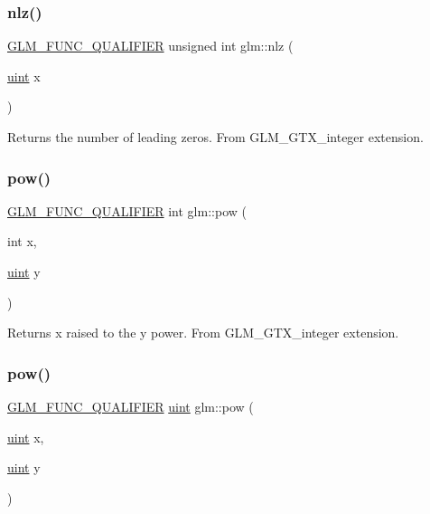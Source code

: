 \subsubsection{\texorpdfstring{nlz()}{nlz()}}
{\footnotesize\ttfamily \mbox{\hyperlink{setup_8hpp_a33fdea6f91c5f834105f7415e2a64407}{G\+L\+M\+\_\+\+F\+U\+N\+C\+\_\+\+Q\+U\+A\+L\+I\+F\+I\+ER}} unsigned int glm\+::nlz (\begin{DoxyParamCaption}\item[{\mbox{\hyperlink{group__core__precision_ga4fd29415871152bfb5abd588334147c8}{uint}}}]{x }\end{DoxyParamCaption})}

Returns the number of leading zeros. From G\+L\+M\+\_\+\+G\+T\+X\+\_\+integer extension. \mbox{\label{group__gtx__integer_ga4937910d5d82dfd9c4bab3da7ff75399}} 
\subsubsection{\texorpdfstring{pow()}{pow()}\hspace{0.1cm}{\footnotesize\ttfamily [1/2]}}
{\footnotesize\ttfamily \mbox{\hyperlink{setup_8hpp_a33fdea6f91c5f834105f7415e2a64407}{G\+L\+M\+\_\+\+F\+U\+N\+C\+\_\+\+Q\+U\+A\+L\+I\+F\+I\+ER}} int glm\+::pow (\begin{DoxyParamCaption}\item[{int}]{x,  }\item[{\mbox{\hyperlink{group__core__precision_ga4fd29415871152bfb5abd588334147c8}{uint}}}]{y }\end{DoxyParamCaption})}

Returns x raised to the y power. From G\+L\+M\+\_\+\+G\+T\+X\+\_\+integer extension. \mbox{\label{group__gtx__integer_gaa8229e850c3cc4ad83492fe390ada044}} 
\subsubsection{\texorpdfstring{pow()}{pow()}\hspace{0.1cm}{\footnotesize\ttfamily [2/2]}}
{\footnotesize\ttfamily \mbox{\hyperlink{setup_8hpp_a33fdea6f91c5f834105f7415e2a64407}{G\+L\+M\+\_\+\+F\+U\+N\+C\+\_\+\+Q\+U\+A\+L\+I\+F\+I\+ER}} \mbox{\hyperlink{group__core__precision_ga4fd29415871152bfb5abd588334147c8}{uint}} glm\+::pow (\begin{DoxyParamCaption}\item[{\mbox{\hyperlink{group__core__precision_ga4fd29415871152bfb5abd588334147c8}{uint}}}]{x,  }\item[{\mbox{\hyperlink{group__core__precision_ga4fd29415871152bfb5abd588334147c8}{uint}}}]{y }\end{DoxyParamCaption})}

